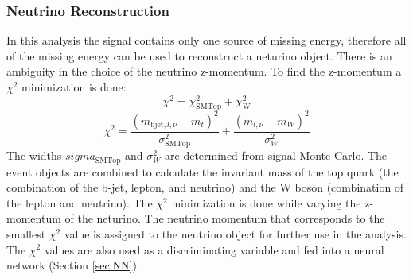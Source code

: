 \subsubsection{Neutrino Reconstruction}
In this analysis the signal contains only one source of missing energy, therefore all of the missing energy can be used to reconstruct a neturino object.  There is an ambiguity in the choice of the neutrino z-momentum.  To find the z-momentum a $\chi^2$ minimization is done:
\[ \chi^2 = \chi_{\text{SMTop}}^2 + \chi_{\text{W}}^2 \]
\[ \chi^2 = \frac{(m_{\text{bjet},l,\nu}-m_t)^2}{\sigma_{\text{SMTop}}^2} + \frac{(m_{l,\nu}-m_W)^2}{\sigma_W^2} \]
The widths $sigma_{\text{SMTop}}$ and $\sigma_W^2$ are determined from signal Monte Carlo.  The event objects are combined to calculate the invariant mass of the top quark (the combination of the b-jet, lepton, and neutrino) and the W boson (combination of the lepton and neutrino).  The $\chi^2$ minimization is done while varying the z-momentum of the neturino.  The neutrino momentum that corresponds to the smallest $\chi^2$ value is assigned to the neutrino object for further use in the analysis.  The $\chi^2$ values are also used as a discriminating variable and fed into a neural network (Section \ref{sec:NN}).







